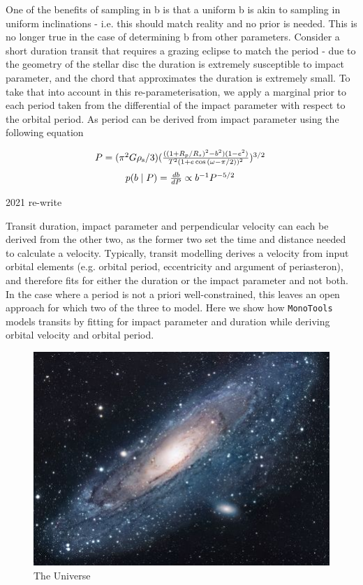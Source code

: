 \documentclass{article}
\begin{document}
One of the benefits of sampling in b is that a uniform b is akin to sampling in uniform inclinations - i.e. this should match reality and no prior is needed.
This is no longer true in the case of determining b from other parameters.
Consider a short duration transit that requires a grazing eclipse to match the period - due to the geometry of the stellar disc the duration is extremely susceptible to impact parameter, and the chord that approximates the duration is extremely small. 
To take that into account in this re-parameterisation, we apply a marginal prior to each period taken from the differential of the impact parameter with respect to the orbital period.
As period can be derived from impact parameter using the following equation


\begin{equation}
$$ P = (\pi^2 G \rho_{\rm s} /3)(\frac{((1+R_p/R_s)^2 - b^2)(1-e^2)}{T^2 (1+e\cos{(\omega - \pi/2)})^2})^{3/2} \; $$
\end{equation}
\begin{equation}
$$ p(b \mid P) = \frac{d b}{d P} \propto b^{-1}P^{-5/2} \; $$
\end{equation}


2021 re-write

Transit duration, impact parameter and perpendicular velocity can each be derived from the other two, as the former two set the time and distance needed to calculate a velocity.
Typically, transit modelling derives a velocity from input orbital elements (e.g. orbital period, eccentricity and argument of periasteron), and therefore fits for either the duration or the impact parameter and not both.
In the case where a period is not a priori well-constrained, this leaves an open approach for which two of the three to model.
Here we show how \texttt{MonoTools} models transits by fitting for impact parameter and duration while deriving orbital velocity and orbital period.



\begin{figure}[h!]
\centering
\includegraphics[scale=1.7]{universe}
\caption{The Universe}
\label{fig:universe}
\end{figure}
\end{document}
